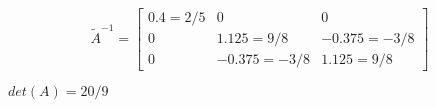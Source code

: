 \[
\tilde A^{-1}=\left[
\begin{array}{ccc}
  0.4=2/5 & 0 & 0 \\
  0 & 1.125=9/8 & -0.375=-3/8 \\
  0 & -0.375=-3/8 & 1.125=9/8
\end{array}\right]
\]

$det(A)=20/9$
